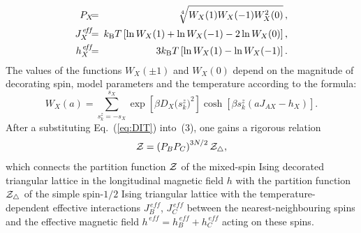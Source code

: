 \documentclass[final,5p,times,sort&compress]{elsarticle}
\begin{document}
\begin{eqnarray}
\label{eq:AJH}
P_X \!\!\!&=&\!\!\! \sqrt[4]{W_X(1)W_X(-1)W_X^{2}(0)}\,,
\nonumber\\
J_{X}^{\,e\!f\!f} \!\!\!&=&\!\!\! k_{\rm B}T\left[\ln W_X(1) + \ln W_X(-1) - 2\ln W_X(0)\right],
\nonumber\\
h_{X}^{\,e\!f\!f} \!\!\!&=&\!\!\! 3k_{\rm B}T\left[\ln W_X(1) - \ln W_X(-1)\right].
\end{eqnarray}
The values of the functions $W_X(\pm1)$ and $W_X(0)$ depend on the magnitude of decorating spin, model parameters and the temperature according to the formula:
\begin{equation}
\label{eq:W}
W_X(a)  =\!\!\! \sum_{s_{k}^{z}= -s_{X}}^{s_{X}}\!\!\exp{\left[\beta D_X \big(s_{k}^{z}\big)^{2}\right]}\cosh\left[\beta s_{k}^{z}(a J_{AX} -h_X)\right].
\end{equation}
After a substituting Eq.~(\ref{eq:DIT}) into~(3), one gains a rigorous relation
\begin{eqnarray}
\label{eq:Z1}
{\cal Z} = \left(P_{B}P_{C}\right)^{3N/2}{\cal Z}_{\triangle},
\end{eqnarray}
which connects the partition function ${\cal Z}$ of the mixed-spin Ising decorated triangular lattice in the longitudinal magnetic field $h$ with the partition function ${\cal Z}_{\triangle}$ of the simple spin-$1/2$ Ising triangular lattice with the temperature-dependent effective interactions $J_{B}^{\,e\!f\!f}$, $J_{C}^{\,e\!f\!f}$ between the nearest-neighbour\-ing spins and the effective magnetic field $h^{\,e\!f\!f} = h_{B}^{\,e\!f\!f}+h_{C}^{\,e\!f\!f}$ acting on these spins.
\end{document}
